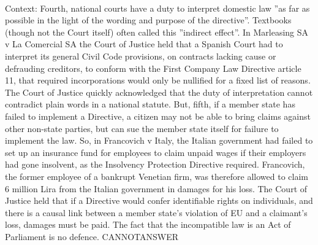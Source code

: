 \documentclass[11pt,a4paper, onecolumn]{article}
\begin{document}
\\ Context: Fourth, national courts have a duty to interpret domestic law ''as far as possible in the light of the wording and purpose of the directive''. Textbooks (though not the Court itself) often called this ''indirect effect''. In Marleasing SA v La Comercial SA the Court of Justice held that a Spanish Court had to interpret its general Civil Code provisions, on contracts lacking cause or defrauding creditors, to conform with the First Company Law Directive article 11, that required incorporations would only be nullified for a fixed list of reasons. The Court of Justice quickly acknowledged that the duty of interpretation cannot contradict plain words in a national statute. But, fifth, if a member state has failed to implement a Directive, a citizen may not be able to bring claims against other non-state parties, but can sue the member state itself for failure to implement the law. So, in Francovich v Italy, the Italian government had failed to set up an insurance fund for employees to claim unpaid wages if their employers had gone insolvent, as the Insolvency Protection Directive required. Francovich, the former employee of a bankrupt Venetian firm, was therefore allowed to claim 6 million Lira from the Italian government in damages for his loss. The Court of Justice held that if a Directive would confer identifiable rights on individuals, and there is a causal link between a member state's violation of EU and a claimant's loss, damages must be paid. The fact that the incompatible law is an Act of Parliament is no defence. CANNOTANSWER
\end{document}
